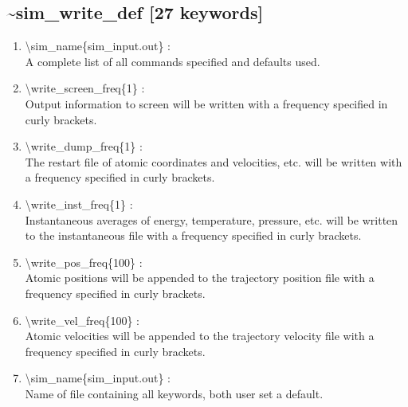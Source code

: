 \documentclass[12pt,titlepage]{article}
\begin{document}
\subsection*{\bf \~{}sim\_write\_def [27 keywords]}
\begin{enumerate}

 \vspace{0.15in} 
 \item   \textbackslash{}sim\_name\{sim\_input.out\} : \\
    A complete list of all commands specified and defaults used.

 \vspace{0.15in} 
 \item   \textbackslash{}write\_screen\_freq\{1\} : \\
   Output information to screen will be written with a frequency specified
   in curly brackets.

 \vspace{0.15in} 
 \item   \textbackslash{}write\_dump\_freq\{1\} : \\
     The restart file of atomic coordinates and velocities, etc. will be
     written with a frequency specified in curly brackets.

 \vspace{0.15in}
 \item   \textbackslash{}write\_inst\_freq\{1\} : \\
     Instantaneous averages of energy, temperature, pressure, etc. will be 
     written to the instantaneous file with a frequency specified in curly 
     brackets.

 \vspace{0.15in} 
 \item   \textbackslash{}write\_pos\_freq\{100\} : \\
    Atomic positions will be appended to the trajectory position file with
    a frequency specified in curly brackets.

 \vspace{0.15in} 
 \item   \textbackslash{}write\_vel\_freq\{100\} : \\
    Atomic velocities will be appended to the trajectory velocity file with
    a frequency specified in curly brackets.

 \vspace{0.15in} 
 \item   \textbackslash{}sim\_name\{sim\_input.out\} : \\
     Name of file containing all keywords, both user set a default.


\end{enumerate}
\end{document}
